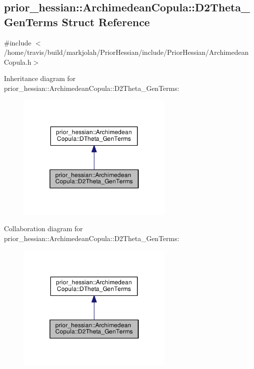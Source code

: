 \hypertarget{structprior__hessian_1_1ArchimedeanCopula_1_1D2Theta__GenTerms}{}\subsection{prior\+\_\+hessian\+:\+:Archimedean\+Copula\+:\+:D2\+Theta\+\_\+\+Gen\+Terms Struct Reference}
\label{structprior__hessian_1_1ArchimedeanCopula_1_1D2Theta__GenTerms}


{\ttfamily \#include $<$/home/travis/build/markjolah/\+Prior\+Hessian/include/\+Prior\+Hessian/\+Archimedean\+Copula.\+h$>$}



Inheritance diagram for prior\+\_\+hessian\+:\+:Archimedean\+Copula\+:\+:D2\+Theta\+\_\+\+Gen\+Terms\+:\nopagebreak
\begin{figure}[H]
\begin{center}
\leavevmode
\includegraphics[width=214pt]{structprior__hessian_1_1ArchimedeanCopula_1_1D2Theta__GenTerms__inherit__graph}
\end{center}
\end{figure}


Collaboration diagram for prior\+\_\+hessian\+:\+:Archimedean\+Copula\+:\+:D2\+Theta\+\_\+\+Gen\+Terms\+:\nopagebreak
\begin{figure}[H]
\begin{center}
\leavevmode
\includegraphics[width=214pt]{structprior__hessian_1_1ArchimedeanCopula_1_1D2Theta__GenTerms__coll__graph}
\end{center}
\end{figure}
